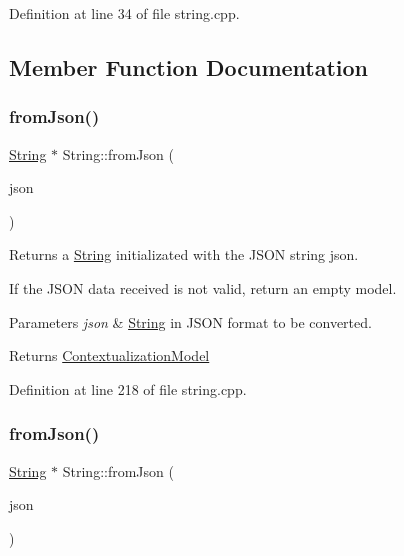 Definition at line 34 of file string.\+cpp.



\subsection{Member Function Documentation}
\mbox{\label{classString_af406afb78e8dae5e7d2deef41d1f9ed7}} 
\subsubsection{\texorpdfstring{from\+Json()}{fromJson()}\hspace{0.1cm}{\footnotesize\ttfamily [1/2]}}
{\footnotesize\ttfamily \mbox{\hyperlink{classString}{String}} $\ast$ String\+::from\+Json (\begin{DoxyParamCaption}\item[{Q\+String \&}]{json }\end{DoxyParamCaption})\hspace{0.3cm}{\ttfamily [static]}}



Returns a \mbox{\hyperlink{classString}{String}} initializated with the J\+S\+ON string json. 

If the J\+S\+ON data received is not valid, return an empty model. 
\begin{DoxyParams}{Parameters}
{\em json} & \mbox{\hyperlink{classString}{String}} in J\+S\+ON format to be converted. \\
\hline
\end{DoxyParams}
\begin{DoxyReturn}{Returns}
\mbox{\hyperlink{classContextualizationModel}{Contextualization\+Model}} 
\end{DoxyReturn}


Definition at line 218 of file string.\+cpp.

\mbox{\label{classString_ab785f3109ff1638b4fb2b052de6cac03}} 
\subsubsection{\texorpdfstring{from\+Json()}{fromJson()}\hspace{0.1cm}{\footnotesize\ttfamily [2/2]}}
{\footnotesize\ttfamily \mbox{\hyperlink{classString}{String}} $\ast$ String\+::from\+Json (\begin{DoxyParamCaption}\item[{Q\+Byte\+Array \&}]{json }\end{DoxyParamCaption})\hspace{0.3cm}{\ttfamily [static]}}



